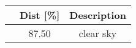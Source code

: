 \begin{longtable*}{|c|c|c|}\hline
{}
&Dist [\%]&Description\\\hline\hline
{}&87.50&clear sky\\\hline
\end{longtable*}
